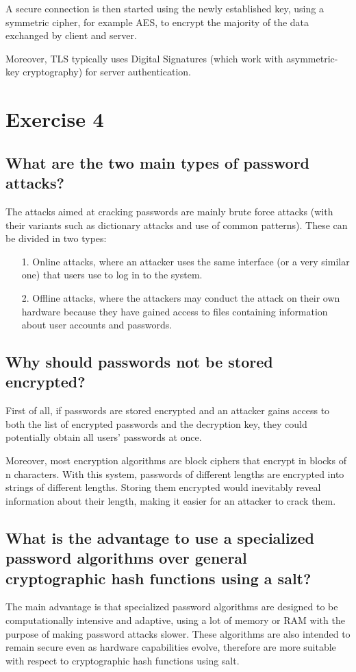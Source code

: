 \documentclass{article}
\begin{document}
A secure connection is then started using the newly established key, using a symmetric cipher, for example AES, to encrypt the majority of the data exchanged by client and server.

Moreover, TLS typically uses Digital Signatures (which work with asymmetric-key cryptography) for server authentication.


\section{Exercise 4}
\subsection{What are the two main types of password attacks?}
The attacks aimed at cracking passwords are mainly brute force attacks (with their variants such as dictionary attacks and use of common patterns). These can be divided in two types:
\begin{itemize}
    \item [1.] Online attacks, where an attacker uses the same interface (or a very similar one) that users use to log in to the system.
    \item [2.] Offline attacks, where the attackers may conduct the attack on their own hardware because they have gained access to files containing information about user accounts and passwords.
\end{itemize}

\subsection{Why should passwords not be stored encrypted?}
First of all, if passwords are stored encrypted and an attacker gains access to both the list of encrypted passwords and the decryption key, they could potentially obtain all users' passwords at once.

Moreover, most encryption algorithms are block ciphers that encrypt in blocks of n characters. With this system, passwords of different lengths are encrypted into strings of different lengths. Storing them encrypted would inevitably reveal information about their length, making it easier for an attacker to crack them.

\subsection{What is the advantage to use a specialized password algorithms over general cryptographic hash functions using a salt?}
The main advantage is that specialized password algorithms are designed to be computationally intensive and adaptive, using a lot of memory or RAM with the purpose of making password attacks slower. These algorithms are also intended to remain secure even as hardware capabilities evolve, therefore are more suitable with respect to cryptographic hash functions using salt.
\end{document}
